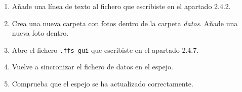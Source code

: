 \documentclass[a4paper,12pt]{article}
\begin{document}
\begin{enumerate}
\item
Añade una línea de texto al fichero que escribiste en el apartado 2.4.2.


\item
Crea una nueva carpeta con fotos dentro de la carpeta 
\emph{datos}. Añade una nueva foto dentro.

\item
Abre el fichero \verb|.ffs_gui| que escribiste en el apartado 2.4.7. 

\item
Vuelve a sincronizar el fichero de datos en el espejo.

\item
Comprueba que el espejo se ha actualizado correctamente.

\end{enumerate}
\end{document}
